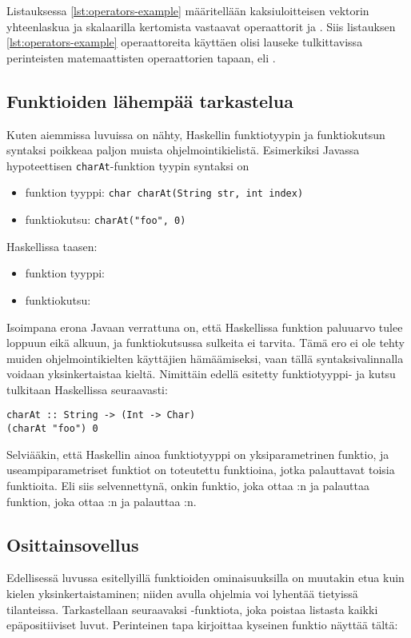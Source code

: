 Listauksessa \ref{lst:operators-example} määritellään kaksiuloitteisen vektorin yhteenlaskua
ja skalaarilla kertomista vastaavat operaattorit \Haskell{<+>} ja .
Siis listauksen \ref{lst:operators-example} operaattoreita käyttäen olisi lauseke
 tulkittavissa perinteisten matemaattisten operaattorien tapaan,
eli .

\iffalse
\subsection{Funktioiden lähempää tarkastelua}
Kuten aiemmissa luvuissa on nähty,
Haskellin funktiotyypin ja funktiokutsun syntaksi poikkeaa paljon muista ohjelmointikielistä.
Esimerkiksi Javassa hypoteettisen \texttt{charAt}-funktion tyypin syntaksi on

\begin{itemize}
    \item funktion tyyppi: \texttt{char charAt(String str, int index)}
    \item funktiokutsu: \texttt{charAt("foo", 0)}
\end{itemize}
Haskellissa taasen:
\begin{itemize}
    \item funktion tyyppi: 
    \item funktiokutsu: 
\end{itemize}

Isoimpana erona Javaan verrattuna on, että Haskellissa funktion paluuarvo tulee loppuun eikä alkuun,
ja funktiokutsussa sulkeita ei tarvita.
Tämä ero ei ole tehty muiden ohjelmointikielten käyttäjien hämäämiseksi,
vaan tällä syntaksivalinnalla voidaan yksinkertaistaa kieltä.
Nimittäin edellä esitetty funktiotyyppi- ja kutsu tulkitaan Haskellissa seuraavasti:

\begin{verbatim}
charAt :: String -> (Int -> Char)
(charAt "foo") 0
\end{verbatim}

Selviääkin, että Haskellin ainoa funktiotyyppi on yksiparametrinen funktio,
ja useampiparametriset funktiot on toteutettu funktioina, jotka palauttavat toisia funktioita.
Eli siis selvennettynä,
 onkin funktio, joka ottaa :n ja palauttaa funktion,
joka ottaa :n ja palauttaa :n.

\subsection{Osittainsovellus}
Edellisessä luvussa esitellyillä funktioiden ominaisuuksilla on muutakin etua
kuin kielen yksinkertaistaminen; niiden avulla ohjelmia voi lyhentää tietyissä tilanteissa.
Tarkastellaan seuraavaksi -funktiota, joka poistaa listasta kaikki
epäpositiiviset luvut.
Perinteinen tapa kirjoittaa kyseinen funktio näyttää tältä:

